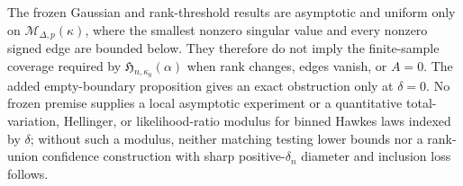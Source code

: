 The frozen Gaussian and rank-threshold results are asymptotic and uniform only on \(\mathcal M_{\Delta,p}(\kappa)\), where the smallest nonzero singular value and every nonzero signed edge are bounded below. They therefore do not imply the finite-sample coverage required by \(\mathfrak H_{n,\kappa_0}(\alpha)\) when rank changes, edges vanish, or \(A=0\). The added empty-boundary proposition gives an exact obstruction only at \(\delta=0\). No frozen premise supplies a local asymptotic experiment or a quantitative total-variation, Hellinger, or likelihood-ratio modulus for binned Hawkes laws indexed by \(\delta\); without such a modulus, neither matching testing lower bounds nor a rank-union confidence construction with sharp positive-\(\delta_n\) diameter and inclusion loss follows.